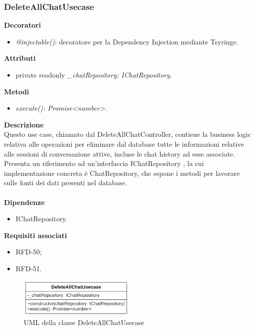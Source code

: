 \subsubsection{DeleteAllChatUsecase}
\textbf{Decoratori}
\begin{itemize}
    \item \textit{@injectable()}: decoratore per la Dependency Injection mediante Tsyringe.
\end{itemize}
\textbf{Attributi}
\begin{itemize}
    \item private readonly \textit{\_chatRepository: IChatRepository}.
\end{itemize}
\textbf{Metodi}
\begin{itemize}
    \item \textit{execute(): Promise<number>.}
\end{itemize}
\textbf{Descrizione}\\
Questo use case, chiamato dal DeleteAllChatController, contiene la business logic relativa alle operazioni per eliminare dal database tutte le informazioni relative alle sessioni di conversazione attive, incluse le chat history ad esse associate.\\
Presenta un riferimento ad un'interfaccia IChatRepository , la cui implementazione concreta è ChatRepository, che espone i metodi per lavorare sulle fonti dei dati presenti nel database.\\ \\
\textbf{Dipendenze}
\begin{itemize}
    \item IChatRepository.
\end{itemize}
\textbf{Requisiti associati}
\begin{itemize}[itemsep=-4pt]
    \item RFD-50;
    \item RFD-51.
\end{itemize}

\begin{figure}[h!]
    \centering  
    \includegraphics[width=0.5\textwidth]{DeleteAllChatUsecase.png}
    \caption{UML della classe DeleteAllChatUsecase}
\end{figure}

